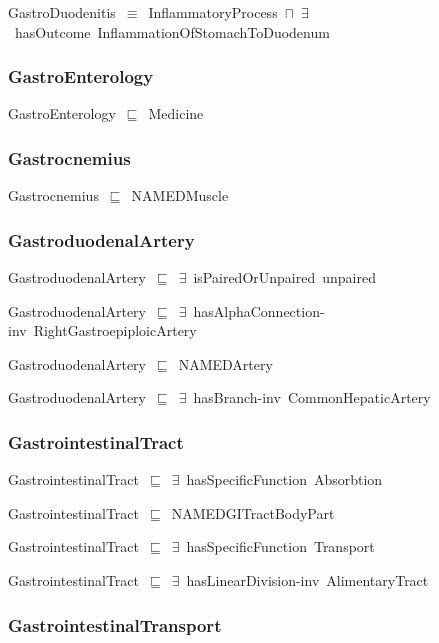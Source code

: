 \documentclass{article}
\begin{document}
GastroDuodenitis~\ensuremath{\equiv}~InflammatoryProcess~\ensuremath{\sqcap}~\ensuremath{\exists}~hasOutcome~InflammationOfStomachToDuodenum

\subsubsection*{GastroEnterology}

GastroEnterology~\ensuremath{\sqsubseteq}~Medicine~

\subsubsection*{Gastrocnemius}

Gastrocnemius~\ensuremath{\sqsubseteq}~NAMEDMuscle~

\subsubsection*{GastroduodenalArtery}

GastroduodenalArtery~\ensuremath{\sqsubseteq}~\ensuremath{\exists}~isPairedOrUnpaired~unpaired~

GastroduodenalArtery~\ensuremath{\sqsubseteq}~\ensuremath{\exists}~hasAlphaConnection-inv~RightGastroepiploicArtery~

GastroduodenalArtery~\ensuremath{\sqsubseteq}~NAMEDArtery~

GastroduodenalArtery~\ensuremath{\sqsubseteq}~\ensuremath{\exists}~hasBranch-inv~CommonHepaticArtery~

\subsubsection*{GastrointestinalTract}

GastrointestinalTract~\ensuremath{\sqsubseteq}~\ensuremath{\exists}~hasSpecificFunction~Absorbtion~

GastrointestinalTract~\ensuremath{\sqsubseteq}~NAMEDGITractBodyPart~

GastrointestinalTract~\ensuremath{\sqsubseteq}~\ensuremath{\exists}~hasSpecificFunction~Transport~

GastrointestinalTract~\ensuremath{\sqsubseteq}~\ensuremath{\exists}~hasLinearDivision-inv~AlimentaryTract~

\subsubsection*{GastrointestinalTransport}
\end{document}
